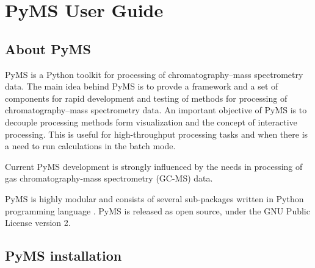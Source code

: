 

\chapter{PyMS User Guide}


\section{About PyMS}

PyMS is a Python toolkit for processing of chromatography--mass spectrometry
data. The main idea behind PyMS is to provde a framework and a set of
components for rapid development and testing of methods for processing of
chromatography--mass spectrometry data. An important objective of PyMS is
to decouple processing methods form visualization and the concept of
interactive processing. This is useful for high-throughput processing tasks
and when there is a need to run calculations in the batch mode.

Current PyMS development is strongly influenced by the needs in processing of
gas chromatography-mass spectrometry (GC-MS) data.

PyMS is highly modular and consists of several sub-packages written in Python
programming language \cite{python}. PyMS is released as open source, under
the GNU Public License version 2.


\section{PyMS installation}

